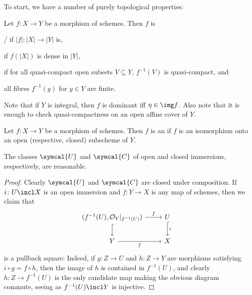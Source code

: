 \documentclass[wip, algebra]{bsteffan-lecturenotes}
\newcommand{\cO}{\mathcal{O}}
\begin{document}
To start, we have a number of purely topological properties:
\begin{definition}
	Let $f\colon X \to Y$ be a morphism of schemes.
	Then $f$ is\textellipsis{}
	\begin{alphanumerate}
		\item {}/ if $|f|\colon |X| \to |Y|$ is, 
		\item {} if $f(|X|)$ is dense in $|Y|$,
		\item {} if for all quasi-compact open subsets $V \subseteq Y$, $f^{-1}(V)$ is quasi-compact, and
		\item {} all fibres $f^{-1}(y)$ for $y \in Y$ are finite.
	\end{alphanumerate}
\end{definition}
Note that if $Y$ is integral, then $f$ is dominant iff $\eta \in \img f$.
Also note that it is enough to check quasi-compactness on an open affine cover of $Y$.
\begin{definition}
	Let $f\colon X \to Y$ be a morphism of schemes.
	Then $f$ is an  if $f$ is an isomorphism onto an open (respective, closed) subscheme of $Y$.
\end{definition}
\begin{proposition}
	The classes $\symcal{U}$ and $\symcal{C}$ of open and closed immersions, respectively, are reasonable.
\end{proposition}
\begin{proof}
	Clearly $\symcal{U}$ and $\symcal{C}$ are closed under composition.
	If $i\colon U \incl X$ is an open immersion and $f\colon Y \to X$ is any map of schemes, then we claim that
	\begin{equation*}
		\begin{tikzcd}
			(f^{-1}(U), \cO_Y|_{f^{-1}(U)})
					\ar[r, "f"]
					\ar[d, hook]
				& U
					\ar[d, hook, "i"]
			\\
			Y	
					\ar[r, swap, "f"]
				& X
		\end{tikzcd}
	\end{equation*}
	is a pullback square:
	Indeed, if $g\colon Z \to U$ and $h\colon Z \to Y$ are morphisms satisfying $i \circ g = f \circ h$, then the image of $h$ is contained in $f^{-1}(U)$, and clearly $h\colon Z \to f^{-1}(U)$ is the only candidate map making the obvious diagram commute, seeing as $f^{-1}(U) \incl Y$ is injective.
\end{proof}
\end{document}
